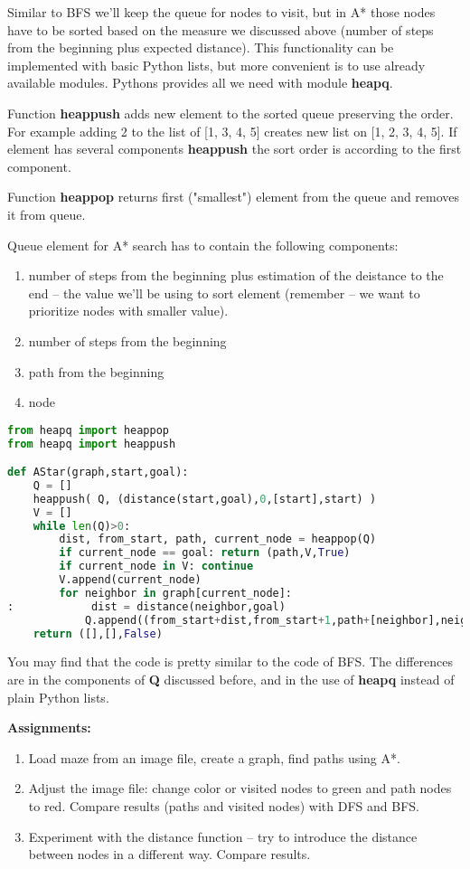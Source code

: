 Similar to BFS we'll keep the queue for nodes to visit, but in A*
those nodes have to be sorted based on the measure we discussed above
(number of steps from the beginning plus expected distance).
This functionality can be implemented with basic Python lists,
but more convenient is to use already available modules.
Pythons provides all we need with module \textbf{heapq}. 

Function \textbf{heappush} adds new element to the sorted queue 
preserving the order. For example adding 2 to the list of [1, 3, 4, 5]
creates new list on [1, 2, 3, 4, 5]. If element has several
components \textbf{heappush} the sort order is according to the
first component. 

Function \textbf{heappop} returns first ("smallest") element from
the queue and removes it from queue.

Queue element for A* search has to contain the following components:
\begin{enumerate}
\item number of steps from the beginning plus estimation of the deistance
to the end -- the value we'll be using to sort element (remember --
we want to prioritize nodes with smaller value).
\item number of steps from the beginning
\item path from the beginning
\item node
\end{enumerate}

\begin{lstlisting}[language=Python,style=codelst2,caption={Python: A* search}]
from heapq import heappop
from heapq import heappush

def AStar(graph,start,goal):
    Q = []
    heappush( Q, (distance(start,goal),0,[start],start) )
    V = []
    while len(Q)>0:
        dist, from_start, path, current_node = heappop(Q)
        if current_node == goal: return (path,V,True)
        if current_node in V: continue
        V.append(current_node)
        for neighbor in graph[current_node]:
:            dist = distance(neighbor,goal)
            Q.append((from_start+dist,from_start+1,path+[neighbor],neighbor))
    return ([],[],False)
\end{lstlisting}

You may find that the code is pretty similar to the code of BFS.
The differences are in the components of \textbf{Q} discussed before,
and in the use of \textbf{heapq} instead of plain Python lists.

\begin{tcolorbox}
\textbf{Assignments:}
\begin{enumerate}
\item Load maze from an image file, create a graph, find paths
using A*.
\item Adjust the image file: change color
or visited nodes to green and path nodes to red. Compare results 
(paths and visited nodes) with DFS and BFS.
\item Experiment with the distance function -- try to introduce
the distance between nodes in a different way. Compare results.
\end{enumerate}
\end{tcolorbox}


